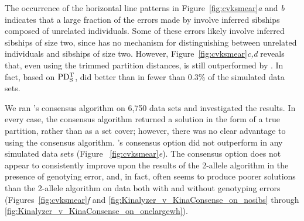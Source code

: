 The occurrence of the horizontal line patterns in Figure~\ref{fig:cvksmear}{\em a} and {\em b} 
indicates that a large fraction of the errors made by \kinalyzer{} involve inferred sibships composed 
of unrelated individuals.  Some of these errors likely involve inferred sibships of size two, since 
\kinalyzer{} has no mechanism for distinguishing between unrelated individuals and sibships of size 
two.   However, Figure~\ref{fig:cvksmear}{\em c,d} reveals that, even using the trimmed partition 
distances, \kinalyzer{} is still outperformed by \colony{}.   In fact, based on $\mathrm{PD_S^T}$, \kinalyzer{} 
did better than \colony{} in fewer than 0.3\% of the simulated data sets. 

We ran \kinalyzer{}'s consensus algorithm on 6,750 data sets and investigated the results.  In every 
case, the consensus algorithm returned a solution in the form of a true partition, rather than as a set 
cover; however, there was no clear advantage to using the consensus algorithm. \kinalyzer{}'s consensus 
option did not outperform \colony{} in any simulated data sets (Figure~
\ref{fig:cvksmear}{\em e}).  The consensus option does not appear to consistently  improve upon the 
results of the 2-allele algorithm in the presence of genotying error, and, in fact, often seems to 
produce poorer solutions than the 2-allele algorithm on data both with and without genotyping errors 
(Figures~\ref{fig:cvksmear}{\em f} and \ref{fig:Kinalyzer_v_KinaConsense_on_nosibs} through 
\ref{fig:Kinalyzer_v_KinaConsense_on_onelargewh}). 

